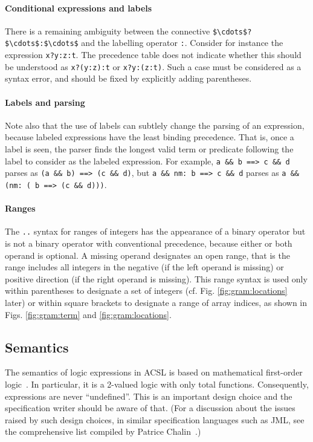 \paragraph{Conditional expressions and labels}
There is a remaining ambiguity between the connective
\lstinline|$\cdots$?$\cdots$:$\cdots$| and the labelling operator
\lstinline|:|. Consider for instance the
expression \lstinline|x?y:z:t|. The precedence table does not indicate
whether this should be understood as \lstinline|x?(y:z):t| or
\lstinline|x?y:(z:t)|.
Such a case must be considered as a syntax error, and should be fixed
by explicitly adding parentheses.

\paragraph{Labels and parsing}
Note also that the use of labels can subtlely change the parsing of an
expression, because labeled expressions have the least binding precedence.
That is, once a label is seen, the parser finds the longest valid term or
predicate following the label to consider as the labeled expression.
For example, \lstinline|a && b ==> c && d| parses as 
\lstinline|(a && b) ==> (c && d)|, but
\lstinline|a && nm: b ==> c && d| parses as
\lstinline|a && (nm: ( b ==> (c && d)))|.

\paragraph{Ranges}
The \lstinline|..| syntax for ranges of integers has the appearance of a
binary operator but is not a binary operator with conventional precedence,
because either or both operand is optional.  
A missing operand designates an
open range, that is the range includes all integers in the negative (if the left operand is missing) or positive direction (if the right operand is missing).
This range syntax is used only within parentheses to designate a set of 
integers (cf. Fig. \ref{fig:gram:locations} later) or within square brackets to designate a 
range of array indices, as shown in Figs.  \ref{fig:gram:term} and 
\ref{fig:gram:locations}.


\subsection{Semantics}
\label{sec:twovaluedlogic}

The semantics of logic expressions in ACSL is based on
mathematical first-order
logic~\cite{wikipedia-fo-logic}. In
particular, it is a 2-valued logic with only total functions. Consequently,
expressions are never ``undefined''.
This is an important design choice and the specification writer should
be aware of that. (For a discussion about the issues raised by such
design choices, in similar specification languages such as JML, see
the comprehensive list compiled by Patrice
Chalin~\cite{chalin05ftfjp,chalin07icse}.)

